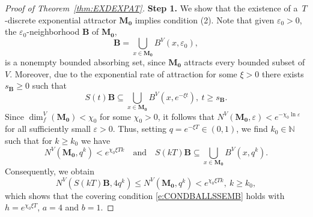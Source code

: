 \documentclass[a4paper,12pt,reqno]{amsart}
\theoremstyle{plain}
\theoremstyle{definition}
\numberwithin{equation}{section}
\newcommand{\N}{\mathbb{N}}
\newcommand{\eps}{\varepsilon}
\newcommand{\dimf}{\operatorname{dim}_{f}}
\renewcommand{\geq}{\geqslant}
\renewcommand{\leq}{\leqslant}
\begin{document}
\begin{proof}[Proof of Theorem~\ref{thm:EXDEXPAT}]
\textbf{Step 1.}
We show that the existence of a~$T$-discrete exponential attractor 
$\mathbf{M_0}$ implies condition (2).  
Note that given $\eps_0>0$, the $\eps_0$-neighborhood $\mathbf{B}$ of $\mathbf{M_0}$,
$$\mathbf{B}=\bigcup_{x\in\mathbf{M_0}}B^{V}(x,\eps_0),$$
is a nonempty bounded absorbing set, since $\mathbf{M_0}$ attracts every bounded subset of $V$.
Moreover, due to the exponential rate of attraction for some $\xi>0$
there exists $s_{\mathbf{B}}\geq 0$ such that
\begin{equation*}
S(t)\mathbf{B}\subseteq\bigcup_{x\in\mathbf{M_0}}B^{V}(x,e^{-\xi t}),\ t\geq s_{\mathbf{B}}.
\end{equation*}
Since $\dimf^{V}(\mathbf{M_0})<\chi_0$ for some $\chi_0>0$, it follows that 
$N^{V}(\mathbf{M_0},\eps)<e^{-\chi_0\ln\eps}$ for all sufficiently small $\eps>0$.
Thus, setting $q=e^{-\xi T}\in(0,1)$, we find $k_0\in\N$ such that for $k\geq k_0$ we have 
$$N^{V}(\mathbf{M_0},q^{k})< e^{\chi_{0}\xi Tk}\quad \text{and}\quad S(kT)\mathbf{B}\subseteq\bigcup_{x\in\mathbf{M_0}}B^{V}(x,q^{k}).$$
Consequently, we obtain
$$N^{V}(S(kT)\mathbf{B},4q^{k})\leq N^{V}(\mathbf{M_0},q^{k})< e^{\chi_{0}\xi Tk},\ k\geq k_0,$$
which shows that the covering condition \eqref{e:CONDBALLSSEMB} holds with  $h=e^{\chi_{0}\xi T}$,  $a=4$ and $b=1$.


\end{proof}
\end{document}
